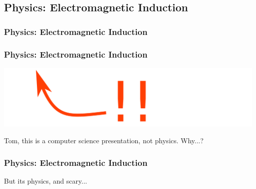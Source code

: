 \documentclass[unknownkeysallowed]{beamer}
\begin{document}
\subsection{Physics: Electromagnetic Induction}
\begin{frame}
  \frametitle{Physics: Electromagnetic Induction}
\end{frame}
\begin{frame}
\frametitle{\textcolor{uipoppy}{Physics:} Electromagnetic Induction}
  \includegraphics[scale=.5]{figures/arrow.png}
  \begin{center}\begin{minipage}{.9\textwidth}
     \begin{block}{Tom, this is a computer science presentation, \newline not physics. Why...?}
     \end{block}
  \end{minipage}\end{center}
\end{frame}
\begin{frame}
\frametitle{Physics: Electromagnetic Induction}
  \begin{center}\begin{minipage}{.9\textwidth}
     \begin{block}{But its physics, and scary...}
     \end{block}
  \end{minipage}\end{center}
\end{frame}
\end{document}

